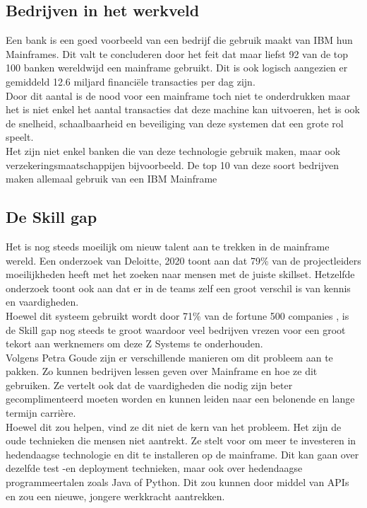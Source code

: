 \subsection{Bedrijven in het werkveld}
Een bank is een goed voorbeeld van een bedrijf die gebruik maakt van IBM hun Mainframes. Dit valt te concluderen door het feit dat maar liefst 92 van de top 100 banken wereldwijd een mainframe gebruikt. Dit is ook logisch aangezien er gemiddeld 12.6 miljard financiële transacties per dag zijn. \autocite{Wagle2017} \\
Door dit aantal is de nood voor een mainframe toch niet te onderdrukken maar het is niet enkel het aantal transacties dat deze machine kan uitvoeren, het is ook de snelheid, schaalbaarheid en beveiliging van deze systemen dat een grote rol speelt. \\
Het zijn niet enkel banken die van deze technologie gebruik maken, maar ook  verzekeringsmaatschappijen bijvoorbeeld. De top 10 van deze soort bedrijven maken allemaal gebruik van een IBM Mainframe \autocite{Tozzi2022}

\subsection{De Skill gap}
Het is nog steeds moeilijk om nieuw talent aan te trekken in de mainframe wereld. Een onderzoek van Deloitte, 2020 %
toont aan dat 79\% van de projectleiders moeilijkheden heeft met het zoeken naar mensen met de juiste skillset. Hetzelfde onderzoek toont ook aan dat er in de teams zelf een groot verschil is van kennis en vaardigheden.  \\ Hoewel dit systeem gebruikt wordt door 71\% van de fortune 500 companies \autocite{Tozzi2022} , is de Skill gap nog steeds te groot waardoor veel bedrijven vrezen voor een groot tekort aan werknemers om deze Z Systems te onderhouden.
\\
Volgens Petra Goude zijn er verschillende manieren om dit probleem aan te pakken. Zo kunnen bedrijven lessen geven over Mainframe en hoe ze dit gebruiken. Ze vertelt ook dat de vaardigheden die nodig zijn beter gecomplimenteerd moeten worden en kunnen leiden naar een belonende en lange termijn carrière. \\ Hoewel dit zou helpen, vind ze dit niet de kern van het probleem. Het zijn de oude technieken die mensen niet aantrekt. Ze stelt voor om meer te investeren in hedendaagse technologie en dit te installeren op de mainframe. Dit kan gaan over dezelfde test -en deployment technieken, maar ook over hedendaagse programmeertalen zoals Java of Python. Dit zou kunnen door middel van APIs en zou een nieuwe, jongere werkkracht aantrekken. \autocite{Goude2023}


